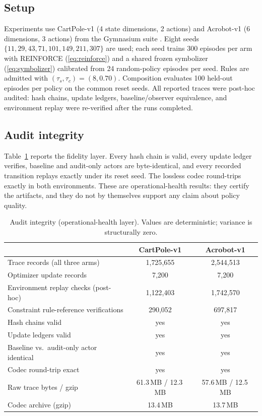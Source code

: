 \documentclass[11pt]{article}
\begin{document}
\subsection{Setup}
\label{sec:experiments:setup}

Experiments use CartPole-v1 (4 state dimensions, 2 actions) and Acrobot-v1 (6 dimensions, 3
actions) from the Gymnasium suite \cite{towers2024gymnasium}. Eight seeds
$\{11,29,43,71,101,149,211,307\}$ are used; each seed trains 300 episodes per arm with REINFORCE
(\ref{eq:reinforce}) and a shared frozen symbolizer (\ref{eq:symbolizer}) calibrated from 24
random-policy episodes per seed. Rules are admitted with $(\tau_s,\tau_c)=(8,0.70)$. Composition
evaluates 100 held-out episodes per policy on the common reset seeds. All reported traces were
post-hoc audited: hash chains, update ledgers, baseline/observer equivalence, and environment
replay were re-verified after the runs completed.

\subsection{Audit integrity}
\label{sec:experiments:integrity}

Table~\ref{tab:integrity} reports the fidelity layer. Every hash chain is valid, every update
ledger verifies, baseline and audit-only actors are byte-identical, and every recorded transition
replays exactly under its reset seed. The lossless codec round-trips exactly in both environments.
These are operational-health results: they certify the artifacts, and they do not by themselves
support any claim about policy quality.

\begin{table}[t]
\centering
\caption{Audit integrity (operational-health layer). Values are deterministic; variance is
structurally zero.}
\label{tab:integrity}
\begin{tabular}{lcc}
\toprule
 & CartPole-v1 & Acrobot-v1 \\
\midrule
Trace records (all three arms) & 1{,}725{,}655 & 2{,}544{,}513 \\
Optimizer update records & 7{,}200 & 7{,}200 \\
Environment replay checks (post-hoc) & 1{,}122{,}403 & 1{,}742{,}570 \\
Constraint rule-reference verifications & 290{,}052 & 697{,}817 \\
Hash chains valid & yes & yes \\
Update ledgers valid & yes & yes \\
Baseline vs.\ audit-only actor identical & yes & yes \\
Codec round-trip exact & yes & yes \\
Raw trace bytes / gzip & 61.3\,MB / 12.3\,MB & 57.6\,MB / 12.5\,MB \\
Codec archive (gzip) & 13.4\,MB & 13.7\,MB \\
\bottomrule
\end{tabular}
\end{table}
\end{document}
